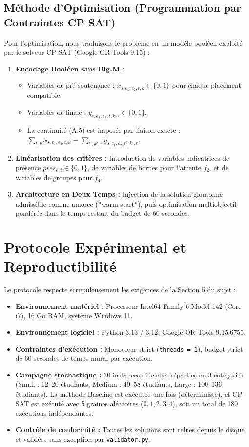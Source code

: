 \documentclass[10pt,a4paper]{article}
\begin{document}
\subsection{Méthode d'Optimisation (Programmation par Contraintes CP-SAT)}
Pour l'optimisation, nous traduisons le problème en un modèle booléen exploité par le solveur CP-SAT (Google OR-Tools 9.15) :
\begin{enumerate}
    \item \textbf{Encodage Booléen sans Big-M :}
    \begin{itemize}
        \item Variables de pré-soutenance : $x_{s, e_1, e_2, t, k} \in \{0, 1\}$ pour chaque placement compatible.
        \item Variables de finale : $y_{s, e_1, e_2, t, k, r} \in \{0, 1\}$.
        \item La continuité (A.5) est imposée par liaison exacte : $\sum_{t, k} x_{s, e_1, e_2, t, k} = \sum_{t', k', r} y_{s, e_1, e_2, t', k', r}$.
    \end{itemize}
    \item \textbf{Linéarisation des critères :} Introduction de variables indicatrices de présence $pres_{e, t} \in \{0, 1\}$, de variables de bornes pour l'attente $f_2$, et de variables de groupes pour $f_4$.
    \item \textbf{Architecture en Deux Temps :} Injection de la solution gloutonne admissible comme amorce (*warm-start*), puis optimisation multiobjectif pondérée dans le temps restant du budget de 60 secondes.
\end{enumerate}

\section{Protocole Expérimental et Reproductibilité}

Le protocole respecte scrupuleusement les exigences de la Section 5 du sujet :
\begin{itemize}
    \item \textbf{Environnement matériel :} Processeur Intel64 Family 6 Model 142 (Core i7), 16 Go RAM, système Windows 11.
    \item \textbf{Environnement logiciel :} Python 3.13 / 3.12, Google OR-Tools 9.15.6755.
    \item \textbf{Contraintes d'exécution :} Monocœur strict (\texttt{threads = 1}), budget strict de 60 secondes de temps mural par exécution.
    \item \textbf{Campagne stochastique :} 30 instances officielles réparties en 3 catégories (Small : 12--20 étudiants, Medium : 40--58 étudiants, Large : 100--136 étudiants). La méthode Baseline est exécutée une fois (déterministe), et CP-SAT est exécuté avec 5 graines aléatoires ($0, 1, 2, 3, 4$), soit un total de 180 exécutions indépendantes.
    \item \textbf{Contrôle de conformité :} Toutes les solutions sont relues depuis le disque et validées sans exception par \texttt{validator.py}.
\end{itemize}
\end{document}
